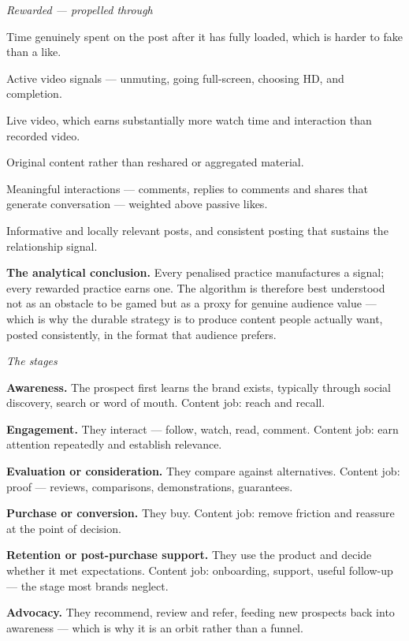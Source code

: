 \begin{qlist}
\textit{Rewarded --- propelled through}
\begin{apts}\setcounter{enumi}{11}
\item Time genuinely spent on the post after it has fully loaded, which is
      harder to fake than a like.
\item Active video signals --- unmuting, going full-screen, choosing HD, and
      completion.
\item Live video, which earns substantially more watch time and interaction
      than recorded video.
\item Original content rather than reshared or aggregated material.
\item Meaningful interactions --- comments, replies to comments and shares that
      generate conversation --- weighted above passive likes.
\item Informative and locally relevant posts, and consistent posting that
      sustains the relationship signal.
\end{apts}

\textbf{The analytical conclusion.} Every penalised practice manufactures a
signal; every rewarded practice earns one. The algorithm is therefore best
understood not as an obstacle to be gamed but as a proxy for genuine audience
value --- which is why the durable strategy is to produce content people
actually want, posted consistently, in the format that audience prefers.

\textit{The stages}
\begin{apts}
\item \textbf{Awareness.} The prospect first learns the brand exists, typically
      through social discovery, search or word of mouth. Content job: reach and
      recall.
\item \textbf{Engagement.} They interact --- follow, watch, read, comment.
      Content job: earn attention repeatedly and establish relevance.
\item \textbf{Evaluation or consideration.} They compare against alternatives.
      Content job: proof --- reviews, comparisons, demonstrations, guarantees.
\item \textbf{Purchase or conversion.} They buy. Content job: remove friction
      and reassure at the point of decision.
\item \textbf{Retention or post-purchase support.} They use the product and
      decide whether it met expectations. Content job: onboarding, support,
      useful follow-up --- the stage most brands neglect.
\item \textbf{Advocacy.} They recommend, review and refer, feeding new prospects
      back into awareness --- which is why it is an orbit rather than a funnel.
\end{apts}


\end{qlist}
